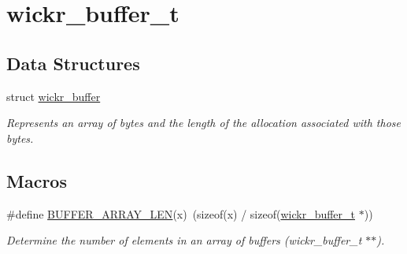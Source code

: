 \hypertarget{group__wickr__buffer}{}\section{wickr\+\_\+buffer\+\_\+t}
\label{group__wickr__buffer}
\subsection*{Data Structures}
\begin{DoxyCompactItemize}
\item 
struct \hyperlink{structwickr__buffer}{wickr\+\_\+buffer}
\begin{DoxyCompactList}\small\item\em Represents an array of bytes and the length of the allocation associated with those bytes. \end{DoxyCompactList}\end{DoxyCompactItemize}
\subsection*{Macros}
\begin{DoxyCompactItemize}
\item 
\#define \hyperlink{group__wickr__buffer_ga0cf6db371b58617c9311f2a357d98164}{B\+U\+F\+F\+E\+R\+\_\+\+A\+R\+R\+A\+Y\+\_\+\+L\+EN}(x)~(sizeof(x) / sizeof(\hyperlink{structwickr__buffer}{wickr\+\_\+buffer\+\_\+t} $\ast$))
\begin{DoxyCompactList}\small\item\em Determine the number of elements in an array of buffers (wickr\+\_\+buffer\+\_\+t $\ast$$\ast$). \end{DoxyCompactList}\end{DoxyCompactItemize}
